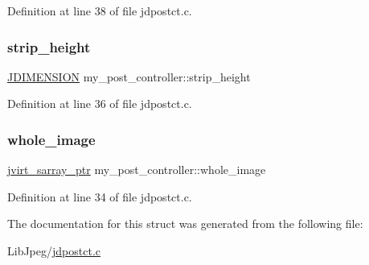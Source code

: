 Definition at line 38 of file jdpostct.\+c.

\mbox{\label{structmy__post__controller_a50ed0e70f9acab0995bbffb3aef6e9aa}} 
\subsubsection{\texorpdfstring{strip\_height}{strip\_height}}
{\footnotesize\ttfamily \mbox{\hyperlink{jmorecfg_8h_a04ed4674f6f1d0d50ec241531e38274f}{J\+D\+I\+M\+E\+N\+S\+I\+ON}} my\+\_\+post\+\_\+controller\+::strip\+\_\+height}



Definition at line 36 of file jdpostct.\+c.

\mbox{\label{structmy__post__controller_ac2336623f2e802993b35b7db30053b68}} 
\subsubsection{\texorpdfstring{whole\_image}{whole\_image}}
{\footnotesize\ttfamily \mbox{\hyperlink{jpeglib_8h_abc0b975077507c35b5a577e3ce9e4d91}{jvirt\+\_\+sarray\+\_\+ptr}} my\+\_\+post\+\_\+controller\+::whole\+\_\+image}



Definition at line 34 of file jdpostct.\+c.



The documentation for this struct was generated from the following file\+:\begin{DoxyCompactItemize}
\item 
Lib\+Jpeg/\mbox{\hyperlink{jdpostct_8c}{jdpostct.\+c}}\end{DoxyCompactItemize}
